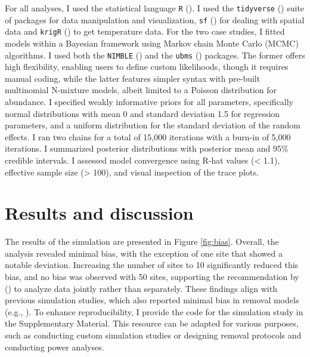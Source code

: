 \documentclass[
  11pt,
  a4paper,
]{article}
\begin{document}
For all analyses, I used the statistical language \texttt{R} (). I used the \texttt{tidyverse} () suite of packages for data manipulation and visualization, \texttt{sf} () for dealing with spatial data and \texttt{krigR} () to get temperature data. For the two case studies, I fitted models within a Bayesian framework using Markov chain Monte Carlo (MCMC) algorithms. I used both the \texttt{NIMBLE} () and the \texttt{ubms} () packages. The former offers high flexibility, enabling users to define custom likelihoods, though it requires manual coding, while the latter features simpler syntax with pre-built multinomial N-mixture models, albeit limited to a Poisson distribution for abundance. I specified weakly informative priors for all parameters, specifically normal distributions with mean 0 and standard deviation 1.5 for regression parameters, and a uniform distribution for the standard deviation of the random effects. I ran two chains for a total of 15,000 iterations with a burn-in of 5,000 iterations. I summarized posterior distributions with posterior mean and 95\% credible intervals. I assessed model convergence using R-hat values (\textless{} 1.1), effective sample size (\textgreater{} 100), and visual inspection of the trace plots.

\section{Results and discussion}\label{results-and-discussion}

The results of the simulation are presented in Figure \ref{fig:bias}. Overall, the analysis revealed minimal bias, with the exception of one site that showed a notable deviation. Increasing the number of sites to 10 significantly reduced this bias, and no bias was observed with 50 sites, supporting the recommendation by () to analyze data jointly rather than separately. These findings align with previous simulation studies, which also reported minimal bias in removal models (e.g., ). To enhance reproducibility, I provide the code for the simulation study in the Supplementary Material. This resource can be adapted for various purposes, such as conducting custom simulation studies or designing removal protocols and conducting power analyses.
\end{document}
